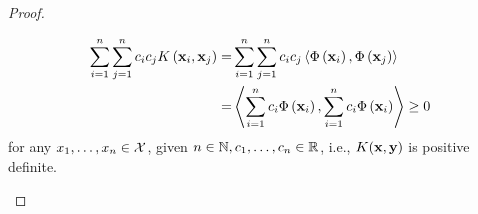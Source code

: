 \begin{proof}
\begin{enumerate}
		      \begin{equation*}
			      \begin{aligned}
				      \sum_{i=1}^{n}\sum_{j=1}^{n}c_{i}c_{j}K\left(\mathbf{x}_{i},\mathbf{x}_{j}\right)= & \sum_{i=1}^{n}\sum_{j=1}^{n}c_{i}c_{j}\left\langle\Phi\left(\mathbf{x}_{i}\right),\Phi\left(\mathbf{x}_{j}\right)\right\rangle       \\
				      =                                                                      & \left\langle\sum_{i=1}^{n}c_{i}\Phi\left(\mathbf{x}_{i}\right),\sum_{i=1}^{n}c_{i}\Phi\left(\mathbf{x}_{i}\right)\right\rangle\geq 0
			      \end{aligned}
		      \end{equation*}
		      for any \(x_{1},\ldots,x_{n}\in\mathcal{X}\), given \(n\in\mathbb{N},c_{1},\ldots,c_{n}\in\mathbb{R}\), i.e., \(K(\mathbf{x},\mathbf{y})\) is positive definite.
	\end{enumerate}
\end{proof}
